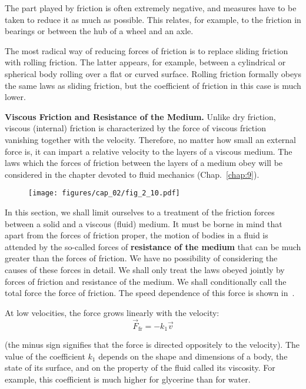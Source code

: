 The part played by friction is often extremely negative, and measures have to be taken to reduce it as much as possible. This relates, for example, to the friction in bearings or between the hub of a wheel and an axle.

The most radical way of reducing forces of friction is to replace sliding friction with rolling friction. The latter appears, for example, between a cylindrical or spherical body rolling over a flat or curved surface. Rolling friction formally obeys the same laws as sliding friction, but the coefficient of friction in this case is much lower.

\textbf{Viscous Friction and Resistance of the Medium.} Unlike dry friction, viscous (internal) friction is characterized by the force of viscous friction vanishing together with the velocity. Therefore, no matter how small an external force is, it can impart a relative velocity to the layers of a viscous medium. The laws which the forces of friction between the layers of a medium obey will be considered in the chapter devoted to fluid mechanics (Chap.~\ref{chap:9}). 

\begin{figure}[t]
	\begin{center}
		\texttt{[image: figures/cap\_02/fig\_2\_10.pdf]}
		\caption[]{}
		\label{fig:2_10}
	\end{center}
	\vspace{-0.7cm}
\end{figure}

In this section, we shall limit ourselves to a treatment of the friction forces between a solid and a viscous (fluid) medium. It must be borne in mind that apart from the forces of friction proper, the motion of bodies in a fluid is attended by the so-called forces of \textbf{resistance of the medium} that can be much greater than the forces of friction. We have no possibility of considering the causes of these forces in detail. We shall only treat the laws obeyed jointly by forces of friction and resistance of the medium. We shall conditionally call the total force the force of friction. The speed dependence of this force is shown in~.

At low velocities, the force grows linearly with the velocity:
\begin{equation}\label{eq:2_36}
\vec{F}_{\text{fr}} = -k_1 \vec{v}
\end{equation}

\noindent
(the minus sign signifies that the force is directed oppositely to the velocity). The value of the coefficient $k_1$ depends on the shape and dimensions of a body, the state of its surface, and on the property of the fluid called its viscosity. For example, this coefficient is much higher for glycerine than for water.

